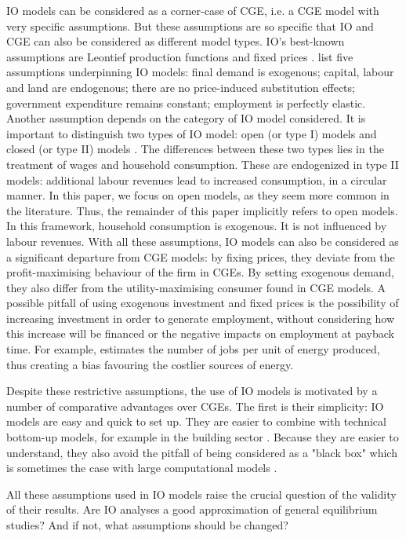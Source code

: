 IO models can be considered as a corner-case of CGE, i.e. a CGE model with very specific assumptions. But these assumptions are so specific that IO and CGE can also be considered as different model types. IO's best-known assumptions are Leontief production functions and fixed prices \citep{Miller2009}. \citet{Dwyer2005} list five assumptions underpinning IO models: final demand is exogenous; capital, labour and land are endogenous; there are no price-induced substitution effects; government expenditure remains constant; employment is perfectly elastic. 
Another assumption depends on the category of IO model considered. It is important to distinguish two types of IO model: open (or type I) models and closed (or type II) models \citep{Miller2009}. The differences between these two types lies in the treatment of wages and household consumption. These are endogenized in type II models: additional labour revenues lead to increased consumption, in a circular manner. In this paper, we focus on open models, as they seem more common in the literature. Thus, the remainder of this paper implicitly refers to open models. In this framework, household consumption is exogenous. It is not influenced by labour revenues. 
With all these assumptions, IO models can also be considered as a significant departure from CGE models: by fixing prices, they deviate from the profit-maximising behaviour of the firm in CGEs. By setting exogenous demand, they also differ from the utility-maximising consumer found in CGE models. A possible pitfall of using exogenous investment and fixed prices is the possibility of increasing investment in order to generate employment, without considering how this increase will be financed or the negative impacts on employment at payback time. For example, \citet{Wei2010} estimates the number of jobs per unit of energy produced, thus creating a bias favouring the costlier sources of energy.

Despite these restrictive assumptions, the use of IO models is motivated by a number of comparative advantages over CGEs. The first is their simplicity: IO models are easy and quick to set up. They are easier to combine with technical bottom-up models, for example in the building sector \citep{Scott2008, Yushchenko2016}. Because they are easier to understand, they also avoid the pitfall of being considered as a "black box" which is sometimes the case with large computational models \citep{Faehn2015}.

All these assumptions used in IO models raise the crucial question of the validity of their results. Are IO analyses a good approximation of general equilibrium studies? And if not, what assumptions should be changed?

